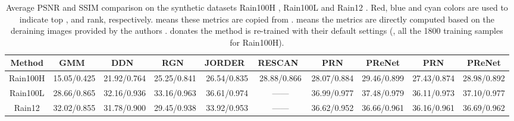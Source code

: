 \documentclass[10pt,twocolumn,letterpaper]{article}
\newcommand{\first}[1] {\textcolor[rgb]{1.0,0.0,0.0}{{#1}}}
\newcommand{\second}[1] {\textcolor[rgb]{0.0,0.0,1.0}{{#1}}}
\newcommand{\third}[1] {\textcolor[rgb]{0.0,0.6,0.6}{{#1}}}
\begin{document}
\begin{table*}[!htb]\small
	\setlength{\tabcolsep}{2pt}
	\caption{Average PSNR and SSIM comparison on the synthetic datasets Rain100H \cite{yang2017deep}, Rain100L \cite{yang2017deep} and Rain12 \cite{li2016rain}. {\first{Red}}, \second{blue} and \third{cyan} colors are used to indicate top \first{}, \second{} and \third{} rank, respectively.
		 means these metrics are copied from \cite{fan2018residual}.
		 means the metrics are directly computed based on the deraining images provided by the authors \cite{yang2017deep}.
		 donates the method is re-trained with their default settings (\ie, all the 1800 training samples for Rain100H).
	}
	\centering
	\begin{tabular}{c|ccccc|cc|cc}
		\hline
		
		\hline
		Method  & GMM~\cite{li2016rain} & DDN~\cite{fu2017removing} & RGN~\cite{fan2018residual}  & JORDER~\cite{yang2017deep} & RESCAN~\cite{li2018recurrent} & PRN  &PReNet & PRN  &PReNet  \\
		\hline
		Rain100H & 15.05/0.425  & 21.92/0.764  & 25.25/0.841  & 26.54/0.835  & \third{28.88}/0.866&   28.07/\third{0.884}   &\first{29.46}/\first{0.899}  &   27.43/0.874   &\second{28.98}/\second{0.892}\\
		Rain100L & 28.66/0.865  & 32.16/0.936  & 33.16/0.963  & 36.61/\third{0.974}  & ------     &   \third{36.99}/\second{0.977}   &\first{37.48}/\first{0.979}  &   36.11/0.973   & \second{37.10}/\second{0.977}\\
		
		Rain12   & 32.02/0.855  & 31.78/0.900  & 29.45/0.938  & 33.92/\third{0.953}  & ------     &   \third{36.62}/0.952   &\second{36.66}/\second{0.961} &  36.16/\second{0.961}   &\first{36.69}/\first{0.962}\\
		\hline
		
		\hline
	\end{tabular}
	\label{table:jorder dataset}
\end{table*}
\end{document}
